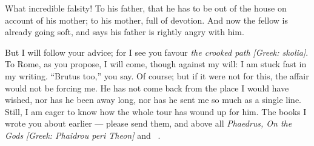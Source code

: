

 What incredible falsity! To his father, that he has to be out of the house on account of his mother; to his mother, full of devotion. And now the fellow is already going soft, and says his father is rightly angry with him.

 But I will follow your advice; for I see you favour \textit{the crooked path} \textit{[Greek: skolia]}. To Rome, as you propose, I will come, though against my will: I am stuck fast in my writing. ``Brutus too,'' you say. Of course; but if it were not for this, the affair would not be forcing me. He has not come back from the place I would have wished, nor has he been away long, nor has he sent me so much as a single line. Still, I am eager to know how the whole tour has wound up for him. The books I wrote you about earlier --- please send them, and above all \textit{Phaedrus, On the Gods} \textit{[Greek: Phaidrou peri Theon]} and \dag\ \dag.
